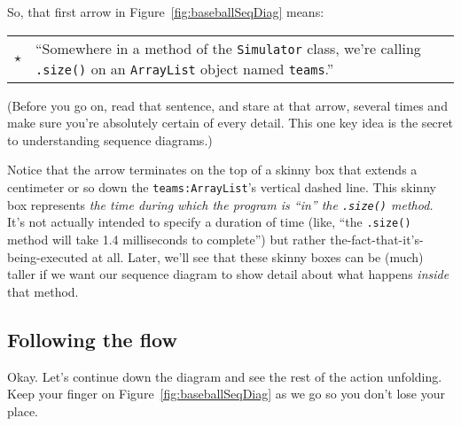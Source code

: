 So, that first arrow in Figure~\ref{fig:baseballSeqDiag} means:

\begin{center}
\begin{tabular}{m{.1in} m{4in}}
\huge $\star$ & \large ``Somewhere in a method of the \texttt{Simulator} class, we're calling
\texttt{.size()} on an \texttt{ArrayList} object named \texttt{teams}.''
\end{tabular}
\end{center}

(Before you go on, read that sentence, and stare at that arrow, several times
and make sure you're absolutely certain of every detail. This one key idea is
the secret to understanding sequence diagrams.)

Notice that the arrow terminates on the top of a skinny box that extends a
centimeter or so down the \texttt{teams:ArrayList}'s vertical dashed line.
This skinny box represents \textit{the time during which the program is ``in''
the \texttt{.size()} method.} It's not actually intended to specify a duration
of time (like, ``the \texttt{.size()} method will take 1.4 milliseconds to
complete'') but rather the-fact-that-it's-being-executed at all. Later, we'll
see that these skinny boxes can be (much) taller if we want our sequence
diagram to show detail about what happens \textit{inside} that method.

\subsection{Following the flow}

Okay. Let's continue down the diagram and see the rest of the action
unfolding. Keep your finger on Figure~\ref{fig:baseballSeqDiag} as we go so
you don't lose your place.

